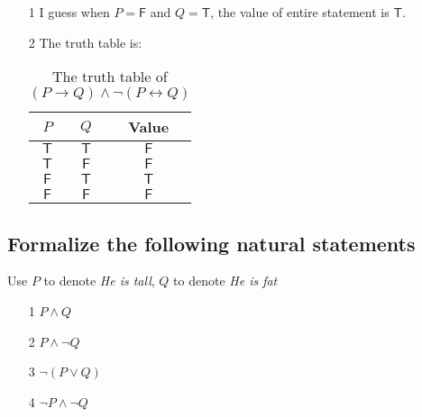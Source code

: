 \documentclass{article}
\begin{document}
\begin{itemize}
    \item[1] I guess when $P=\mathsf{F}$ and $Q=\mathsf{T}$, the value of entire statement is $\mathsf{T}$.
    \item[2] The truth table is:

    \begin{table}[h!]
        \centering
        \begin{tabular}{c|c|c}
             $P$ & $Q$ & \textbf{Value} \\
             \hline
             $\mathsf{T}$ & $\mathsf{T}$ & $\mathsf{F}$\\
             $\mathsf{T}$ & $\mathsf{F}$ & $\mathsf{F}$\\
             $\mathsf{F}$ & $\mathsf{T}$ & $\mathsf{T}$\\
             $\mathsf{F}$ & $\mathsf{F}$ & $\mathsf{F}$
        \end{tabular}
        \caption{The truth table of $(P\to Q)\wedge\lnot(P\leftrightarrow Q)$}
        \label{tab:The Truth Tabel-2}
    \end{table}
\end{itemize}

\subsection{Formalize the following natural statements}

Use $P$ to denote \textit{He is tall}, $Q$ to denote \textit{He is fat}

\begin{itemize}
    \item[1] $P\wedge Q$
    \item[2] $P\wedge\lnot Q$
    \item[3] $\lnot(P\vee Q)$
    \item[4] $\lnot P\wedge\lnot Q$
\end{itemize}
\end{document}
